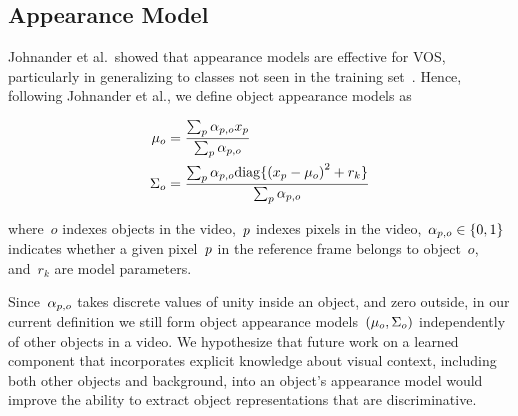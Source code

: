 \subsection{Appearance Model}


Johnander et al.\ showed that appearance models are effective for VOS,
particularly in generalizing to classes not seen in the training
set~\citep{johnander2019agenerative}.  Hence, following Johnander et al., we
define object appearance models as

\begin{subequations}
\begin{align}
        \mu_o{} &= \frac{\sum_p{}\alpha_{p{}, o} x_p{}}{\sum_p{}\alpha_{p{}, o}} \\
        \Sigma_o{} &= \frac{\sum_p{}\alpha_{p{}, o} \mathrm{diag}\{{(x_p - \mu_o{})}^2 + r_k\}}{\sum_p{}\alpha_{p{}, o}}
\end{align}
\label{eqn:appearancemodel}
\end{subequations}

\noindent where~$o$ indexes objects in the video,~$p{}$ indexes pixels in the
video,~$\alpha_{p{}, o} \in \{0, 1\}$ indicates whether a given
pixel~$p{}$ in the reference frame belongs to object~$o$,
and~$r_k$ are model parameters.

Since~$\alpha_{p{}, o}$ takes discrete values of unity inside an object,
and zero outside, in our current definition we still form object appearance
models~$(\mu_o{}, \Sigma_o{})$ independently of other objects in a video.
We hypothesize that future work on a learned component that incorporates
explicit knowledge about visual context, including both other objects and
background, into an object's appearance model would improve the ability to
extract object representations that are discriminative.

